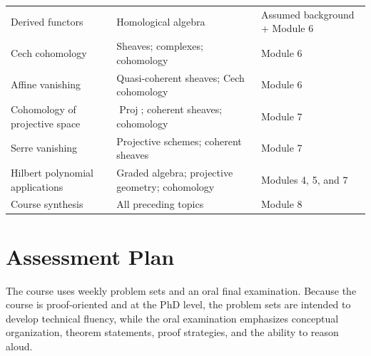 \documentclass[11pt]{article}
\begin{document}
\begin{longtable}{p{}p{}p{}}
Derived functors & Homological algebra & Assumed background + Module 6 \\
Cech cohomology & Sheaves; complexes; cohomology & Module 6 \\
Affine vanishing & Quasi-coherent sheaves; Cech cohomology & Module 6 \\
Cohomology of projective space & $\operatorname{Proj}$; coherent sheaves; cohomology & Module 7 \\
Serre vanishing & Projective schemes; coherent sheaves & Module 7 \\
Hilbert polynomial applications & Graded algebra; projective geometry; cohomology & Modules 4, 5, and 7 \\
Course synthesis & All preceding topics & Module 8 \\
\bottomrule
\end{longtable}

\section{Assessment Plan}

The course uses weekly problem sets and an oral final examination. Because the course is proof-oriented and at the PhD level, the problem sets are intended to develop technical fluency, while the oral examination emphasizes conceptual organization, theorem statements, proof strategies, and the ability to reason aloud.
\end{document}
